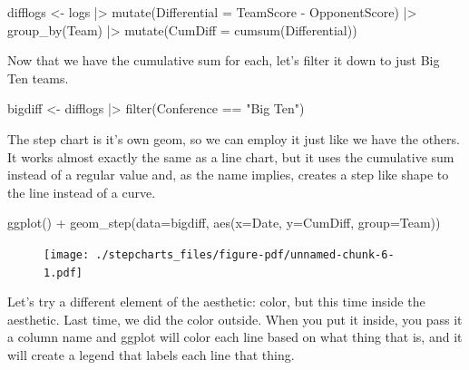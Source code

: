 \documentclass[
  letterpaper,
  DIV=11,
  numbers=noendperiod]{scrreprt}
\newenvironment{Shaded}{\begin{snugshade}}{\end{snugshade}}
\newcommand{\AttributeTok}[1]{\textcolor[rgb]{0.40,0.45,0.13}{#1}}
\newcommand{\FunctionTok}[1]{\textcolor[rgb]{0.28,0.35,0.67}{#1}}
\newcommand{\NormalTok}[1]{\textcolor[rgb]{0.00,0.23,0.31}{#1}}
\newcommand{\OtherTok}[1]{\textcolor[rgb]{0.00,0.23,0.31}{#1}}
\newcommand{\SpecialCharTok}[1]{\textcolor[rgb]{0.37,0.37,0.37}{#1}}
\newcommand{\StringTok}[1]{\textcolor[rgb]{0.13,0.47,0.30}{#1}}
\begin{document}
\begin{Shaded}
\begin{Highlighting}[]
\NormalTok{difflogs }\OtherTok{\textless{}{-}}\NormalTok{ logs }\SpecialCharTok{|\textgreater{}} 
  \FunctionTok{mutate}\NormalTok{(}\AttributeTok{Differential =}\NormalTok{ TeamScore }\SpecialCharTok{{-}}\NormalTok{ OpponentScore) }\SpecialCharTok{|\textgreater{}} 
  \FunctionTok{group\_by}\NormalTok{(Team) }\SpecialCharTok{|\textgreater{}} 
  \FunctionTok{mutate}\NormalTok{(}\AttributeTok{CumDiff =} \FunctionTok{cumsum}\NormalTok{(Differential))}
\end{Highlighting}
\end{Shaded}

Now that we have the cumulative sum for each, let's filter it down to
just Big Ten teams.

\begin{Shaded}
\begin{Highlighting}[]
\NormalTok{bigdiff }\OtherTok{\textless{}{-}}\NormalTok{ difflogs }\SpecialCharTok{|\textgreater{}} \FunctionTok{filter}\NormalTok{(Conference }\SpecialCharTok{==} \StringTok{"Big Ten"}\NormalTok{)}
\end{Highlighting}
\end{Shaded}

The step chart is it's own geom, so we can employ it just like we have
the others. It works almost exactly the same as a line chart, but it
uses the cumulative sum instead of a regular value and, as the name
implies, creates a step like shape to the line instead of a curve.

\begin{Shaded}
\begin{Highlighting}[]
\FunctionTok{ggplot}\NormalTok{() }\SpecialCharTok{+} \FunctionTok{geom\_step}\NormalTok{(}\AttributeTok{data=}\NormalTok{bigdiff, }\FunctionTok{aes}\NormalTok{(}\AttributeTok{x=}\NormalTok{Date, }\AttributeTok{y=}\NormalTok{CumDiff, }\AttributeTok{group=}\NormalTok{Team))}
\end{Highlighting}
\end{Shaded}

\begin{figure}[H]

{\centering \texttt{[image: ./stepcharts\_files/figure-pdf/unnamed-chunk-6-1.pdf]}

}

\end{figure}

Let's try a different element of the aesthetic: color, but this time
inside the aesthetic. Last time, we did the color outside. When you put
it inside, you pass it a column name and ggplot will color each line
based on what thing that is, and it will create a legend that labels
each line that thing.
\end{document}
